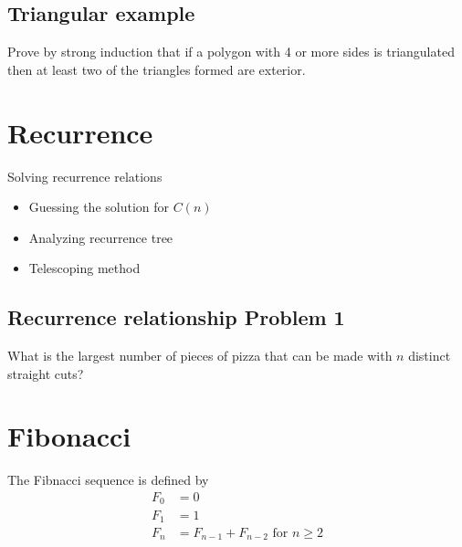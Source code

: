 \subsection{Triangular example}
Prove by strong induction that if a polygon with 4 or more sides is triangulated then at least two of the triangles formed are exterior. 

\section{Recurrence}

\begin{framed}
   Solving recurrence relations  \\
   \begin{itemize}
      \item Guessing the solution for $C(n)$ 
      \item Analyzing recurrence tree 
      \item Telescoping method
   \end{itemize}
\end{framed}

\subsection{Recurrence relationship Problem 1}
What is the largest number of pieces of pizza that can be made with $n$ distinct straight cuts?


\section{Fibonacci}

\begin{framed}
   The Fibnacci sequence is defined by
   \begin{align*}
      F_0 &= 0 \\
      F_1 &= 1 \\
      F_n &= F_{n-1} + F_{n - 2} \text{ for } n \geq 2\\ 
   \end{align*}
\end{framed}



